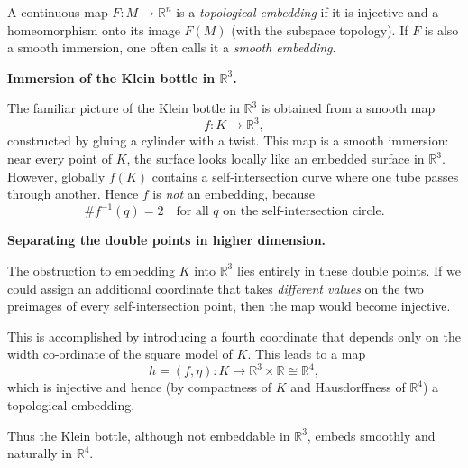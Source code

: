 \begin{solution}
\begin{definition}
	A continuous map $F : M \to \mathbb{R}^n$ is a \emph{topological embedding}
	if it is injective and a homeomorphism onto its image $F(M)$
	(with the subspace topology).
	If $F$ is also a smooth immersion, one often calls it a \emph{smooth embedding}.
\end{definition}

\par\medskip\noindent\textbf{Immersion of the Klein bottle in $\mathbb{R}^3$.}\par\smallskip

The familiar picture of the Klein bottle in $\mathbb{R}^3$ is obtained from a
smooth map
\[
f : K \longrightarrow \mathbb{R}^3,
\]
constructed by gluing a cylinder with a twist. 
This map is a smooth immersion: near every point of $K$, the surface looks
locally like an embedded surface in $\mathbb{R}^3$.  
However, globally $f(K)$ contains a self-intersection curve where one tube
passes through another.  
Hence $f$ is \emph{not} an embedding, because
\[
\# f^{-1}(q) = 2 \quad \text{for all } q \text{ on the self-intersection circle}.
\]

\par\medskip\noindent\textbf{Separating the double points in higher dimension.}\par\smallskip

The obstruction to embedding $K$ into $\mathbb{R}^3$ lies entirely in these
double points.  
If we could assign an additional coordinate that takes \emph{different values}
on the two preimages of every self-intersection point, then the map would
become injective.

This is accomplished by introducing a fourth coordinate that depends only on
the width co-ordinate of the square model of $K$.  
This leads to a map
\[
h = (f,\eta) : K \longrightarrow \mathbb{R}^3 \times \mathbb{R}
\cong \mathbb{R}^4,
\]
which is injective and hence (by compactness of $K$ and Hausdorffness of
$\mathbb{R}^4$) a topological embedding.

Thus the Klein bottle, although not embeddable in $\mathbb{R}^3$, embeds
smoothly and naturally in $\mathbb{R}^4$.
\end{solution}

